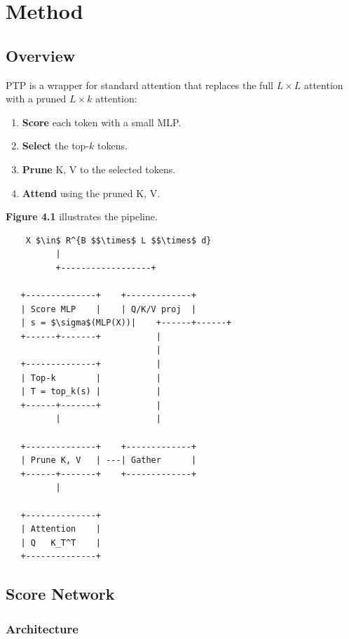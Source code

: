
\section{Method}

\subsection{Overview}

PTP is a wrapper for standard attention that replaces the full $L \times L$ 
attention with a pruned $L \times k$ attention:

\begin{enumerate}
\item \textbf{Score} each token with a small MLP.
\item \textbf{Select} the top-$k$ tokens.
\item \textbf{Prune} K, V to the selected tokens.
\item \textbf{Attend} using the pruned K, V.

\end{enumerate}
\textbf{Figure 4.1} illustrates the pipeline.

\begin{lstlisting}
    X $\in$ R^{B $$\times$ L $$\times$ d}
          |
          +------------------+
                              
   +--------------+    +-------------+
   | Score MLP    |    | Q/K/V proj  |
   | s = $\sigma$(MLP(X))|    +------+------+
   +------+-------+           |
                              |
   +--------------+           |
   | Top-k        |           |
   | T = top_k(s) |           |
   +------+-------+           |
          |                   |
                               
   +--------------+    +-------------+
   | Prune K, V   | ---| Gather      |
   +------+-------+    +-------------+
          |
           
   +--------------+
   | Attention    |
   | Q   K_T^T    |
   +--------------+
\end{lstlisting}

\subsection{Score Network}

\subsubsection{Architecture}

